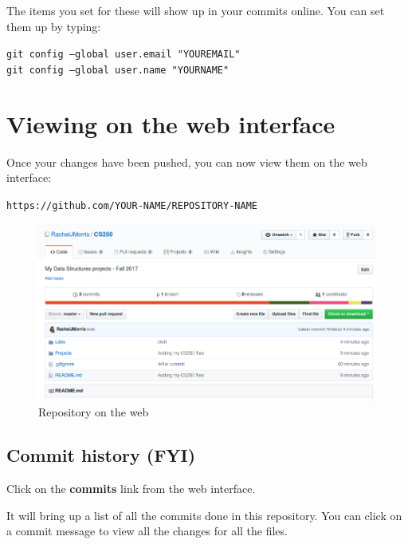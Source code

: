 \documentclass[a4paper,12pt,oneside]{book}
\begin{document}
        The items you set for these will show up in your commits online.
        You can set them up by typing:
        
        \begin{center}
            \texttt{git config --global user.email "YOUREMAIL"} \\
            \texttt{git config --global user.name "YOURNAME"}
        \end{center}
        
    \newpage

    \section{Viewing on the web interface}

        Once your changes have been pushed, you can now view them on the
        web interface:

        \begin{center}
        \texttt{https://github.com/YOUR-NAME/REPOSITORY-NAME}
        \end{center}
        
        \begin{figure}[h]
            \centering
            \includegraphics[width=14cm]{images/github-webrepo.png}
            \caption{Repository on the web}
        \end{figure}

    \newpage
    
        \subsection{Commit history (FYI)}

        Click on the \textbf{commits} link from the web interface.
        
        It will bring up a list of all the commits done in this repository.
        You can click on a commit message to view all the changes for all
        the files.
\end{document}
